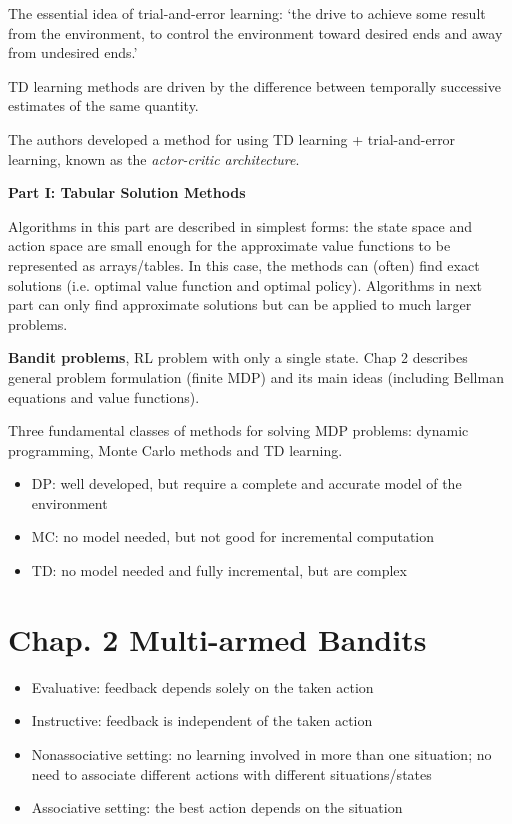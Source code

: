 \documentclass[lang=en,mode=geye,device=normal,color=blue,14pt]{elegantnote}
\DeclareMathOperator*{\1}{\mathbbm{1}}
\begin{document}
The essential idea of trial-and-error learning: `the drive to achieve some result from the environment, to control the environment toward desired ends and away from undesired ends.'

TD learning methods are driven by the difference between temporally successive estimates of the same quantity.

The authors developed a method for using TD learning + trial-and-error learning, known as the \textit{actor-critic architecture}.

\newpage
\textbf{Part I: Tabular Solution Methods}

Algorithms in this part are described in simplest forms: the state space and action space are small enough for the approximate value functions to be represented as arrays/tables.
In this case, the methods can (often) find exact solutions (i.e. optimal value function and optimal policy).
Algorithms in next part can only find approximate solutions but can be applied to much larger problems.

\textbf{Bandit problems}, RL problem with only a single state. Chap 2 describes general problem formulation (finite MDP) and its main ideas (including Bellman equations and value functions).

Three fundamental classes of methods for solving MDP problems: dynamic programming, Monte Carlo methods and TD learning.
\begin{itemize}
\item DP: well developed, but require a complete and accurate model of the environment
\item MC: no model needed, but not good for incremental computation
\item TD: no model needed and fully incremental, but are complex
\end{itemize}

\newpage
\section{Chap. 2 Multi-armed Bandits}
\begin{itemize}
\item Evaluative: feedback depends solely on the taken action
\item Instructive: feedback is independent of the taken action
\item Nonassociative setting: no learning involved in more than one situation; no need to associate different actions with different situations/states
\item Associative setting: the best action depends on the situation
\end{itemize}
\end{document}
